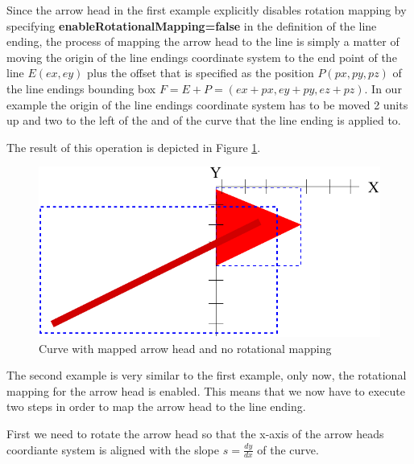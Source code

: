 Since the arrow head in the first example explicitly disables rotation mapping by specifying \textbf{enableRotationalMapping=false}
in the definition of the line ending, the process of mapping the arrow head to the line is simply a matter of moving the origin of 
the line endings coordinate system to the end point of the line $E(ex,ey)$ plus the offset that is specified as the position $P(px,py,pz)$ of the line endings bounding box $F=E+P=(ex+px,ey+py,ez+pz)$. In our example the origin of the line endings coordinate system has to be moved 2 units up and two to the left of the and of the curve that the line ending is applied to.

The result of this operation is depicted in Figure \ref{fig:3ArrowHeadMapping}.

\begin{figure}[!ht]
\begin{center}
\includegraphics[scale=0.25]{figures/ArrowHeadMapping3}
\end{center}
\caption{Curve with mapped arrow head and no rotational mapping} \label{fig:3ArrowHeadMapping}
\end{figure}

The second example is very similar to the first example, only now, the rotational mapping for the arrow head is enabled.
This means that we now have to execute two steps in order to map the arrow head to the line ending.

First we need to rotate the arrow head so that the x-axis of the arrow heads coordiante system is aligned with the slope $s=\frac{dy}{dx}$ of the curve.

